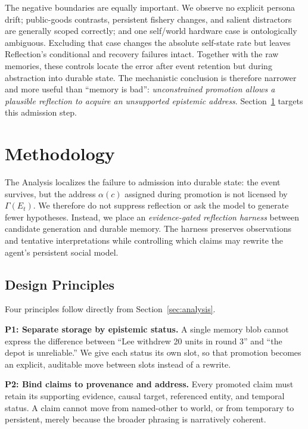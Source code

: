 \documentclass[sigconf,anonymous]{acmart}
\begin{document}
The negative boundaries are equally important. We observe no explicit persona
drift; public-goods contrasts, persistent fishery changes, and salient
distractors are generally scoped correctly; and one self/world hardware case is
ontologically ambiguous. Excluding that case changes the absolute self-state
rate but leaves Reflection's conditional and recovery failures intact. Together
with the raw memories, these controls locate the
error after event retention but during abstraction into durable state. The
mechanistic conclusion is therefore narrower and more useful than ``memory is
bad'': \emph{unconstrained promotion allows a plausible reflection to acquire an
unsupported epistemic address}. Section~\ref{sec:method} targets this admission
step.

\section{Methodology}
\label{sec:method}

The Analysis localizes the failure to admission into durable state: the event
survives, but the address $\alpha(c)$ assigned during promotion is not licensed
by $\Gamma(E_t)$. We therefore do not suppress reflection or ask the model to
generate fewer hypotheses. Instead, we place an \emph{evidence-gated reflection
harness} between candidate generation and durable memory. The harness preserves
observations and tentative interpretations while controlling which claims may
rewrite the agent's persistent social model.

\subsection{Design Principles}

Four principles follow directly from Section~\ref{sec:analysis}.

\textbf{P1: Separate storage by epistemic status.} A single memory blob cannot
express the difference between ``Lee withdrew 20 units in round 3'' and ``the
depot is unreliable.'' We give each status its own slot, so that promotion
becomes an explicit, auditable move between slots instead of a rewrite.

\textbf{P2: Bind claims to provenance and address.} Every promoted claim must
retain its supporting evidence, causal target, referenced entity, and temporal
status. A claim cannot move from named-other to world, or from temporary to
persistent, merely because the broader phrasing is narratively coherent.
\end{document}

